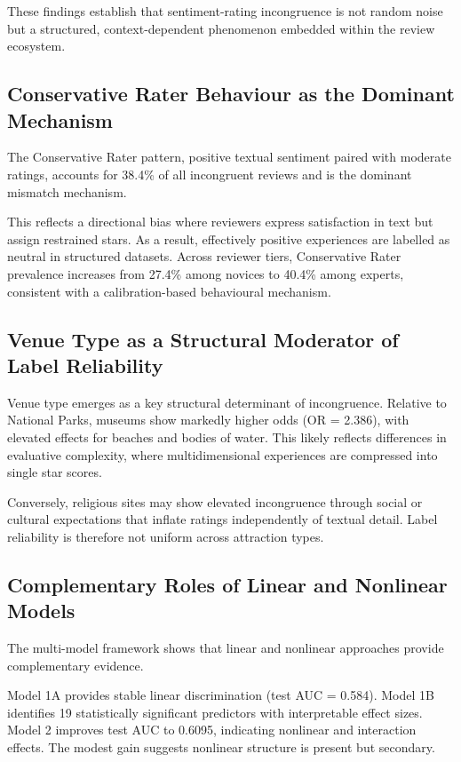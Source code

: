 \documentclass[conference]{IEEEtran}
\begin{document}
These findings establish that sentiment-rating incongruence is not random noise but a structured, context-dependent phenomenon embedded within the review ecosystem.

\subsection{Conservative Rater Behaviour as the Dominant Mechanism}
The Conservative Rater pattern, positive textual sentiment paired with moderate ratings, accounts for 38.4\% of all incongruent reviews and is the dominant mismatch mechanism.

This reflects a directional bias where reviewers express satisfaction in text but assign restrained stars. As a result, effectively positive experiences are labelled as neutral in structured datasets. Across reviewer tiers, Conservative Rater prevalence increases from 27.4\% among novices to 40.4\% among experts, consistent with a calibration-based behavioural mechanism.

\subsection{Venue Type as a Structural Moderator of Label Reliability}
Venue type emerges as a key structural determinant of incongruence. Relative to National Parks, museums show markedly higher odds (OR = 2.386), with elevated effects for beaches and bodies of water. This likely reflects differences in evaluative complexity, where multidimensional experiences are compressed into single star scores.

Conversely, religious sites may show elevated incongruence through social or cultural expectations that inflate ratings independently of textual detail. Label reliability is therefore not uniform across attraction types.

\subsection{Complementary Roles of Linear and Nonlinear Models}
The multi-model framework shows that linear and nonlinear approaches provide complementary evidence.

Model 1A provides stable linear discrimination (test AUC = 0.584). Model 1B identifies 19 statistically significant predictors with interpretable effect sizes. Model 2 improves test AUC to 0.6095, indicating nonlinear and interaction effects. The modest gain suggests nonlinear structure is present but secondary.
\end{document}
